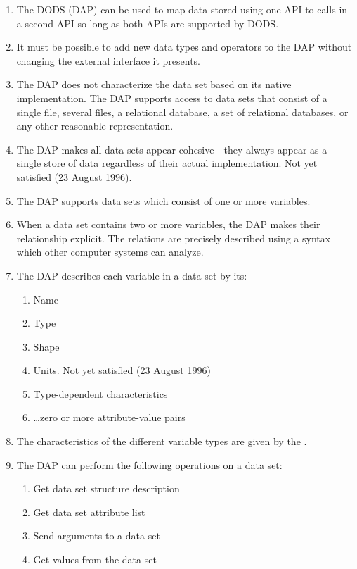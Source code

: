 \begin{enumerate}

\item The DODS \dap (DAP) can be used to map data stored using one API to
  calls in a second API so long as both APIs are supported by DODS\@.

\item It must be possible to add new data types and operators to the DAP
  without changing the external interface it presents.

\item The DAP does not characterize the data set based on its native
  implementation. The DAP supports access to data sets that consist of a
  single file, several files, a relational database, a set of relational
  databases, or any other reasonable representation.

\item The DAP makes all data sets appear cohesive---they always appear as a
  single store of data regardless of their actual implementation. Not yet
  satisfied (23 August 1996). %

\item The DAP supports data sets which consist of one or more variables.

\item When a data set contains two or more variables, the DAP makes their
  relationship explicit. The relations are precisely described using a syntax
  which other computer systems can analyze.

\item The DAP describes each variable in a data set by its:

\begin{enumerate}
\item Name
\item Type
\item Shape
\item Units. Not yet satisfied (23 August 1996) %
\item Type-dependent characteristics
\item \ldots zero or more attribute-value pairs
\end{enumerate}

\item The characteristics of the different variable types are given by the
  \dm.

\item The DAP can perform the following operations on a data set:

\begin{enumerate}
\item Get data set structure description
\item Get data set attribute list
\item Send arguments to a data set
\item Get values from the data set
\end{enumerate}

\end{enumerate}

